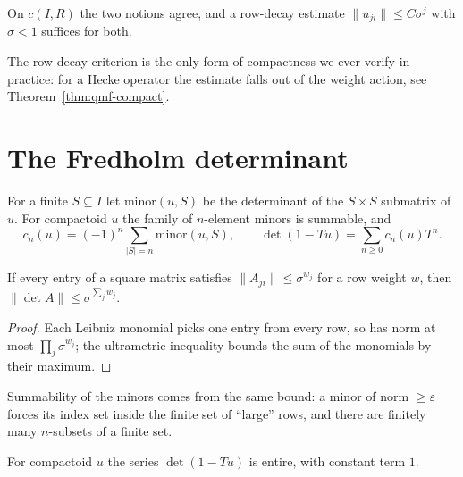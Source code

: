 \begin{proposition}
  \label{prop:compactoid-criterion}
  \leanok
  On $c(I,R)$ the two notions agree, and a row-decay estimate $\lVert u_{ji} \rVert \leq C
  \sigma^{j}$ with $\sigma < 1$ suffices for both.
\end{proposition}

The row-decay criterion is the only form of compactness we ever verify in practice: for a Hecke
operator the estimate falls out of the weight action, see Theorem~\ref{thm:qmf-compact}.

\section{The Fredholm determinant}

\begin{definition}
  \label{def:minor}
  \leanok
  For a finite $S \subseteq I$ let $\mathrm{minor}(u, S)$ be the determinant of the $S \times S$
  submatrix of $u$.  For compactoid $u$ the family of $n$-element minors is summable, and
  \[
    c_n(u) = (-1)^n \sum_{\lvert S \rvert = n} \mathrm{minor}(u, S), \qquad
    \det(1 - Tu) = \sum_{n \geq 0} c_n(u) T^n .
  \]
\end{definition}

\begin{lemma}
  \label{lem:hadamard}
  \leanok
  If every entry of a square matrix satisfies $\lVert A_{ji}\rVert \leq \sigma^{w_j}$ for a row
  weight $w$, then $\lVert \det A \rVert \leq \sigma^{\sum_j w_j}$.
\end{lemma}

\begin{proof}
  \leanok
  Each Leibniz monomial picks one entry from every row, so has norm at most $\prod_j
  \sigma^{w_j}$; the ultrametric inequality bounds the sum of the monomials by their maximum.
\end{proof}

Summability of the minors comes from the same bound: a minor of norm $\geq \varepsilon$ forces
its index set inside the finite set of ``large'' rows, and there are finitely many $n$-subsets of
a finite set.

\begin{theorem}
  \label{thm:charpowerseries-entire}
  \leanok
  For compactoid $u$ the series $\det(1 - Tu)$ is entire, with constant term $1$.
\end{theorem}

